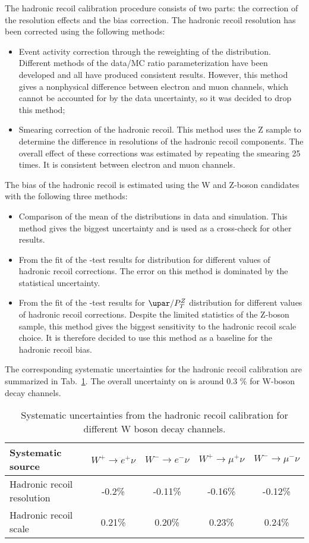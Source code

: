 The hadronic recoil calibration procedure consists of two parts: the correction of the resolution effects and the bias correction. 
The hadronic recoil resolution has been corrected using the following methods:
\begin{itemize}
\item Event activity correction through the reweighting of the \sumet distribution. Different methods of the data/MC ratio parameterization have been developed and all have produced consistent results. However, this method gives a nonphysical difference between electron and muon channels, which cannot be accounted for by the data uncertainty, so it was decided to drop this method;
\item Smearing correction of the hadronic recoil. This method uses the Z sample to determine the difference in resolutions of the hadronic recoil components. The overall effect of these corrections was estimated by repeating the smearing 25 times. It is  consistent between electron and muon channels.
\end{itemize}
The bias of the hadronic recoil  is estimated using the W and Z-boson candidates with the following three methods:
\begin{itemize}
\item Comparison of the mean of the \mtw distributions in  data and simulation. This method gives the biggest uncertainty and is used as a cross-check for other results.
\item From the \chiD fit of the \chiD-test results for \mtw distribution for different values of hadronic recoil corrections. The error on this method is dominated by the statistical uncertainty.
\item From the \chiD fit of the \chiD-test results for $\upar/P_T^{Z}$ distribution for different values of hadronic recoil corrections. Despite the limited statistics of the Z-boson sample, this method gives the biggest sensitivity to the hadronic recoil scale choice. It is therefore decided to use this method as a baseline for the hadronic recoil bias.
\end{itemize}

The corresponding systematic uncertainties for the hadronic recoil calibration are summarized in Tab.~\ref{tab:SFHadronRecoilBias}. The overall uncertainty on \etmiss is around 0.3 \% for  W-boson decay channels.

\begin{table}[!tb]
\caption{Systematic uncertainties from the hadronic recoil calibration for different W boson decay channels.}
\label{tab:SFHadronRecoilBias}
\begin{center}
\begin{tabular}{| l || c | c | c | c |}
\hline
Systematic source & $W^{+} \to e^{+}\nu$ & $W^{-} \to e^{-}\nu$  & $W^{+} \to \mu^{+}\nu$ & $W^{-} \to \mu^{-}\nu$ \\
\hline
\hline
Hadronic recoil resolution & -0.2\% & -0.11\% & -0.16\% & -0.12\% \\
Hadronic recoil scale &  0.21\% & 0.20\% & 0.23\% & 0.24\% \\
\hline
\end{tabular}
\end{center}
\end{table}
